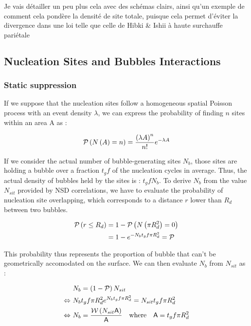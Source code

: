 \npar

{\color{red} Je vais détailler un peu plus cela avec des schémas clairs, ainsi qu'un exemple de comment cela pondère la densité de site totale, puisque cela permet d'éviter la divergence dans une loi telle que celle de Hibki \& Ishii à haute surchauffe pariétale} 



\subsection{Nucleation Sites and Bubbles Interactions}


\subsubsection{Static suppression}

If we suppose that the nucleation sites follow a homogeneous spatial Poisson process with an event density $\lambda$, we can express the probability of finding $n$ sites within an area A as :

\begin{align}
\mathcal{P}\left( N\left( A \right)=n \right)=\frac{\left( \lambda A \right)^{n}}{n!}e^{-\lambda A}
\end{align}

If we consider the actual number of bubble-generating sites $N_{b}$, those sites are holding a bubble over a fraction $t_{g}f$ of the nucleation cycles in average. Thus, the actual density of bubbles held by the sites is : $t_{g}f N_{b}$. To derive $N_{b}$ from the value $N_{sit}$ provided by NSD correlations, we have to evaluate the probability of nucleation site overlapping, which corresponds to a distance $r$ lower than $R_{d}$ between two bubbles. 

\begin{align}
\mathcal{P}\left( r\leq R_{d} \right) &=1-\mathcal{P}\left( N\left( \pi R_{d}^{2} \right)=0 \right)\\
&=1-e^{-N_{b}t_{g}f\pi R_{d}^{2}} = \mathcal{P}
\end{align}

This probability thus represents the proportion of bubble that can't be geometrically accomodated on the surface. We can then evaluate $N_{b}$ from $N_ {sit}$ as :

\begin{align}
&N_{b}=\parth{1-\mathcal{P}}N_{sit} \\
%
\Leftrightarrow\  &N_{b}t_{g}f\pi R_{d}^{2}e^{N_{b}t_{g}f \pi R_{d}^{2}}= N_{sit}t_{g}f \pi R_{d}^{2} \\
%
\Leftrightarrow\   &N_{b} = \frac{\mathcal{W}\parth{N_{sit}\mathsf{A}}}{\mathsf{A}}\ \ \ \text{where}\ \ \ \mathsf{A}=t_{g}f\pi R_{d}^{2}
\end{align}



